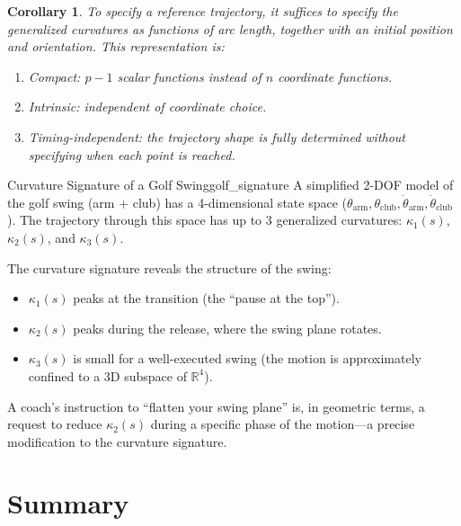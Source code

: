 \documentclass[12pt, openany]{book}
\theoremstyle{plain}
\newtheorem{corollary}[theorem]{Corollary}
\newcommand{\Reals}{\mathbb{R}}
\begin{document}
\begin{corollary}
  To specify a reference trajectory, it suffices to specify the generalized
  curvatures as functions of arc length, together with an initial position
  and orientation. This representation is:
  \begin{enumerate}[label=(\roman*)]
    \item \emph{Compact}: $p - 1$ scalar functions instead of $n$ coordinate
      functions.
    \item \emph{Intrinsic}: independent of coordinate choice.
    \item \emph{Timing-independent}: the trajectory shape is fully determined
      without specifying when each point is reached.
  \end{enumerate}
\end{corollary}

\begin{example}{Curvature Signature of a Golf Swing}{golf_signature}
  A simplified 2-DOF model of the golf swing (arm + club) has a 4-dimensional
  state space ($\theta_{\text{arm}}, \theta_{\text{club}}, \dot{\theta}_{\text{arm}},
  \dot{\theta}_{\text{club}}$). The trajectory through this space has up to 3
  generalized curvatures: $\kappa_1(s)$, $\kappa_2(s)$, and $\kappa_3(s)$.

  The curvature signature reveals the structure of the swing:
  \begin{itemize}[leftmargin=1cm]
    \item $\kappa_1(s)$ peaks at the transition (the ``pause at the top'').
    \item $\kappa_2(s)$ peaks during the release, where the swing plane rotates.
    \item $\kappa_3(s)$ is small for a well-executed swing (the motion is
      approximately confined to a 3D subspace of $\Reals^4$).
  \end{itemize}

  A coach's instruction to ``flatten your swing plane'' is, in geometric terms,
  a request to reduce $\kappa_2(s)$ during a specific phase of the motion---a
  precise modification to the curvature signature.
\end{example}

\section{Summary}
\end{document}
